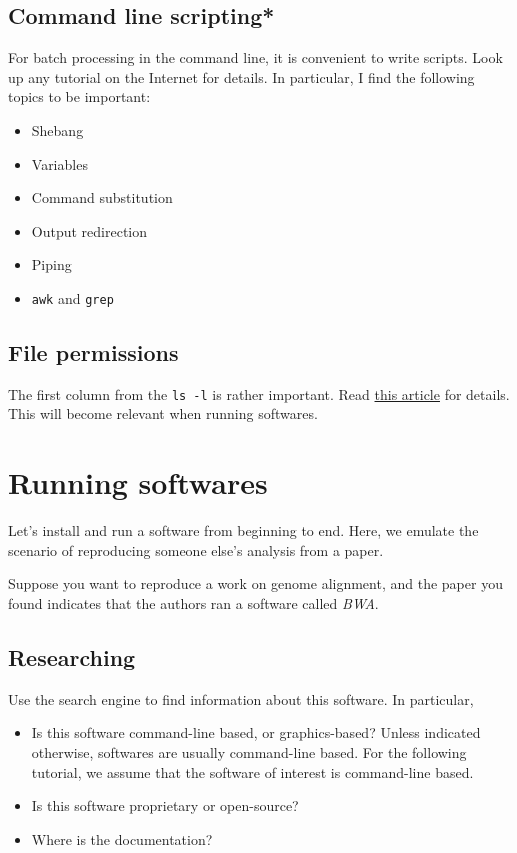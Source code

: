 \documentclass[12pt,letterpaper]{article}
\begin{document}
\subsection{Command line scripting*} \label{sec:command-line-scripting}

For batch processing in the command line, it is convenient to write scripts. Look up any tutorial on the Internet for details. In particular, I find the following topics to be important:

\begin{itemize}
   \item Shebang
   \item Variables
   \item Command substitution
   \item Output redirection
   \item Piping
   \item \texttt{awk} and \texttt{grep}
\end{itemize}

\subsection{File permissions}

The first column from the \texttt{ls -l} is rather important. Read \href{https://www.redhat.com/sysadmin/linux-file-permissions-explained}{this article} for details. This will become relevant when running softwares.

\section{Running softwares}

Let's install and run a software from beginning to end. Here, we emulate the scenario of reproducing someone else's analysis from a paper.

Suppose you want to reproduce a work on genome alignment, and the paper you found indicates that the authors ran a software called \textit{BWA}.

\subsection{Researching}

Use the search engine to find information about this software. In particular,

\begin{itemize}
   \item Is this software command-line based, or graphics-based? Unless indicated otherwise, softwares are usually command-line based. For the following tutorial, we assume that the software of interest is command-line based.
   \item Is this software proprietary or open-source?
   \item Where is the documentation?
\end{itemize}
\end{document}
